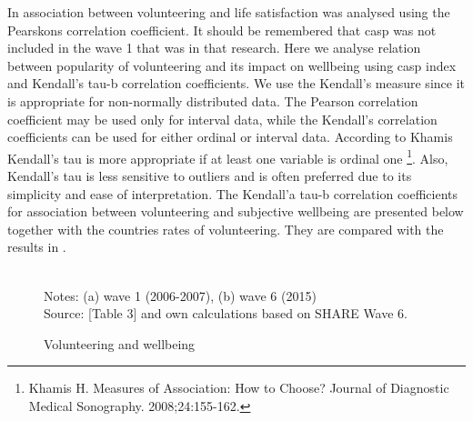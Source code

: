 \documentclass[10pt, letterpaper]{article}
\begin{document}
\begin{spacing}{1.4}
In \citet{haski09} association between volunteering and life satisfaction was analysed using the Pearskons correlation coefficient. It should be remembered that casp was not included in the wave 1 that was in that research. Here we analyse relation between popularity of volunteering and its impact on wellbeing using casp index and Kendall's tau-b correlation coefficients. We use the Kendall's measure since it is appropriate for non-normally distributed data. The Pearson correlation coefficient may be used only for interval data, while the Kendall's correlation coefficients can be used for either ordinal or interval data. According to Khamis  Kendall's tau is more appropriate if at least one variable is ordinal one \footnote{Khamis H. Measures of Association: How to Choose? Journal of Diagnostic Medical Sonography. 2008;24:155-162.}. Also, Kendall's tau is less sensitive to outliers and is often preferred due to its simplicity and ease of interpretation. The Kendall'a tau-b correlation coefficients for association between volunteering and subjective wellbeing  are presented below together with the countries rates of volunteering. They are compared with the results in \citet{haski09}. 


\begin{figure}[H]
\centering
\caption{Volunteering and wellbeing} 
\label{fig:taub}
\begin{minipage}{1\linewidth}
\quad
{}~\\
{\footnotesize Notes: (a) wave 1 (2006-2007), (b) wave 6 (2015) }~\\
{\footnotesize Source: \citet{haski09} [Table 3] and own calculations based on SHARE Wave 6.}
\end{minipage}
\end{figure} 


\end{spacing}
\end{document}
